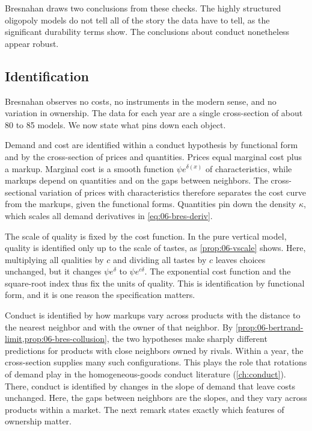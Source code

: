 Bresnahan draws two conclusions from these checks. The highly structured oligopoly models do not tell all of the
story the data have to tell, as the significant durability terms show. The conclusions about conduct nonetheless
appear robust.

\subsection{Identification}\label{sec:06-bres-ident}

Bresnahan observes no costs, no instruments in the modern sense, and no variation in ownership. The data for each
year are a single cross-section of about 80 to 85 models. We now state what pins down each object.

Demand and cost are identified within a conduct hypothesis by functional form and by the cross-section of prices
and quantities. Prices equal marginal cost plus a markup. Marginal cost is a smooth function $\psi e^{\delta(x)}$ of
characteristics, while markups depend on quantities and on the gaps between neighbors. The cross-sectional variation
of prices with characteristics therefore separates the cost curve from the markups, given the functional forms.
Quantities pin down the density $\kappa$, which scales all demand derivatives in \eqref{eq:06-bres-deriv}.

The scale of quality is fixed by the cost function. In the pure vertical model, quality is identified only up to the
scale of tastes, as \cref{prop:06-vscale} shows. Here, multiplying all qualities by $c$ and dividing all tastes by $c$
leaves choices unchanged, but it changes $\psi e^{\delta}$ to $\psi e^{c\delta}$. The exponential cost function and
the square-root index thus fix the units of quality. This is identification by functional form, and it is one reason
the specification matters.

Conduct is identified by how markups vary across products with the distance to the nearest neighbor and with the
owner of that neighbor. By \cref{prop:06-bertrand-limit,prop:06-bres-collusion}, the two hypotheses make sharply
different predictions for products with close neighbors owned by rivals. Within a year, the cross-section supplies
many such configurations. This plays the role that rotations of demand play in the homogeneous-goods conduct
literature (\cref{ch:conduct}). There, conduct is identified by changes in the slope of demand that leave costs
unchanged. Here, the gaps between neighbors are the slopes, and they vary across products within a market. The next
remark states exactly which features of ownership matter.

